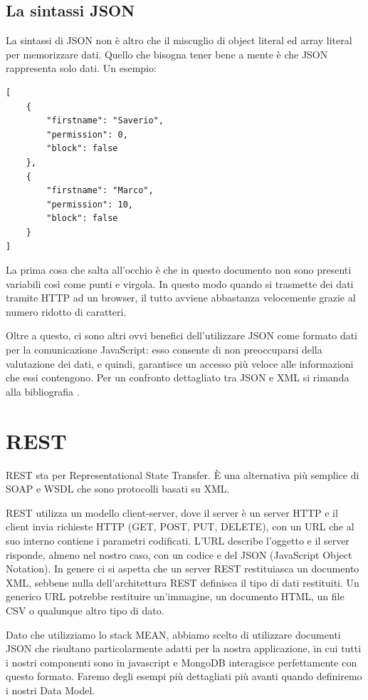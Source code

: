 \subsection{La sintassi JSON}
La sintassi di JSON non è altro che il miscuglio di object literal ed array literal per memorizzare dati.
Quello che bisogna tener bene a mente è che JSON rappresenta solo dati.
Un esempio:
\begin{lstlisting}[style=JavaScriptCode]
[
	{
		"firstname": "Saverio",
		"permission": 0,
		"block": false
	},
	{
		"firstname": "Marco",
		"permission": 10,
		"block": false
	}
]
\end{lstlisting}
La prima cosa che salta all'occhio è che in questo documento non sono presenti variabili così come punti e virgola.
In questo modo quando si trasmette dei dati tramite HTTP ad un browser, il tutto avviene abbastanza velocemente grazie al numero ridotto di caratteri.

Oltre a questo, ci sono altri ovvi benefici dell'utilizzare JSON come formato dati per la comunicazione JavaScript: esso consente di non preoccuparsi della valutazione dei dati, e quindi, garantisce un accesso più veloce alle informazioni che essi contengono. 
Per un confronto dettagliato tra JSON e XML si rimanda alla bibliografia  \cite[pag. 251]{ajax}.
\section{REST}
REST sta per Representational State Transfer\cite{rest}. È una alternativa più semplice di SOAP e WSDL che sono protocolli basati su XML.

REST utilizza un modello client-server, dove il server è un server HTTP e il client invia richieste HTTP (GET, POST, PUT, DELETE), con un URL che al suo interno contiene i parametri codificati. L'URL describe l'oggetto e il server risponde, almeno nel nostro caso, con un codice e del JSON (JavaScript Object Notation).
In genere ci si aspetta che un server REST restituiasca un documento XML, sebbene nulla dell'architettura REST definisca il tipo di dati restituiti.
Un generico URL potrebbe restituire un'immagine, un documento HTML, un file CSV o qualunque altro tipo di dato.

Dato che utilizziamo lo stack MEAN, abbiamo scelto di utilizzare documenti JSON che risultano particolarmente adatti per la nostra applicazione, in cui tutti i nostri componenti sono in javascript e MongoDB interagisce perfettamente con questo formato. 
Faremo degli esempi più dettagliati più avanti quando definiremo i nostri Data Model.

